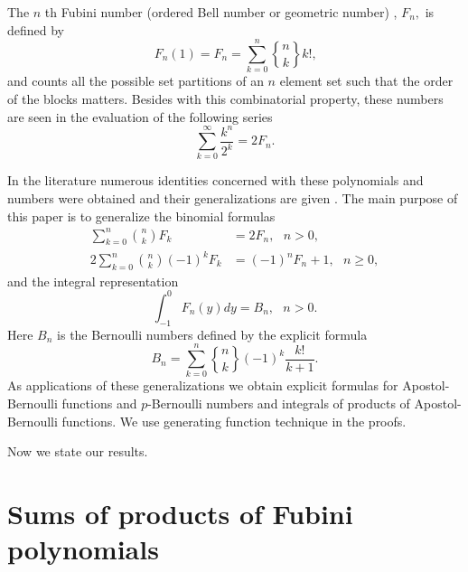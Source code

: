 \documentclass{article}%
\begin{document}
The $n$ th Fubini number (ordered Bell number or geometric number) \cite{Da,
Gr, T}, $F_{n},$ is defined by
\begin{equation}
F_{n}\left(  1\right)  =F_{n}=\sum_{k=0}^{n}%
\genfrac{\{}{\}}{0pt}{}{n}{k}%
k!\text{,} \label{14}%
\end{equation}
and counts all the possible set partitions of an $n$ element set such that the
order of the blocks matters. Besides with this combinatorial property, these
numbers are seen in the evaluation of the following series
\begin{equation}
\sum_{k=0}^{\infty}\frac{k^{n}}{2^{k}}=2F_{n}. \label{1}%
\end{equation}


In the literature numerous identities concerned with these polynomials and
numbers were obtained \cite{B, B2, B3, B4, Dil1, MEZO} and their
generalizations are given \cite{B, Dil2, Kargin, Mezo2}. The main purpose of
this paper is to generalize the binomial formulas \cite{Diletal}%
\begin{align}
\sum_{k=0}^{n}\binom{n}{k}F_{k}  &  =2F_{n},\text{ \ }n>0,\label{5}\\
2\sum_{k=0}^{n}\binom{n}{k}\left(  -1\right)  ^{k}F_{k}  &  =\left(
-1\right)  ^{n}F_{n}+1,\text{ \ }n\geq0, \label{6}%
\end{align}
and the integral representation \cite{KELLER}%
\begin{equation}
\int_{-1}^{0}F_{n}\left(  y\right)  dy=B_{n},\text{ \ }n>0. \label{26}%
\end{equation}
Here $B_{n}$ is the Bernoulli numbers defined by the explicit formula
\begin{equation}
B_{n}=\sum_{k=0}^{n}%
\genfrac{\{}{\}}{0pt}{}{n}{k}%
\left(  -1\right)  ^{k}\frac{k!}{k+1}. \label{32}%
\end{equation}
As applications of these generalizations we obtain explicit formulas for
Apostol-Bernoulli functions and $p$-Bernoulli numbers and integrals of
products of Apostol-Bernoulli functions. We use generating function technique
in the proofs.

Now we state our results.

\section{Sums of products of Fubini polynomials}
\end{document}
